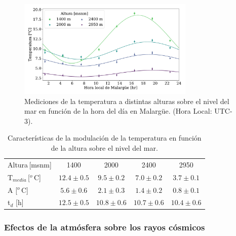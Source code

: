 \begin{figure}[H]
	\centering
	\includegraphics[width=0.75\textwidth]{delay.pdf}
	\caption{Mediciones de la temperatura a distintas alturas sobre el nivel del mar en función de la hora del día en Malargüe. (Hora Local: UTC-3).}
	\label{fig:delay}
\end{figure}
\begin{table}[H]
\centering
\begin{tabular}{l|c|c|c|c}
	Altura\,[msnm]          & 1400          &   2000        &   2400            &  2950 \\	
	T$_{media}$\,[$^o$\,C] 	& $12.4\pm0.5$  & $9.5\pm0.2$	&  $7.0\pm0.2$	    & $3.7\pm0.1$	\\
	A [$^o$\,C] 	        & $5.6\pm0.6$   & $2.1\pm0.3$   &  $1.4\pm0.2$      & $0.8\pm0.1$	\\
	t$_d$ [h] 	            & $12.5\pm0.5$  & $10.8\pm0.6$  &  $10.7\pm0.6$     & $10.4\pm0.6$\\ \hline
\end{tabular}
\caption{Características de la modulación de la temperatura en función de la altura sobre el nivel del mar.}\label{tabla:delay}
\end{table}

\subsubsection{Efectos de la atmósfera sobre los rayos cósmicos}

